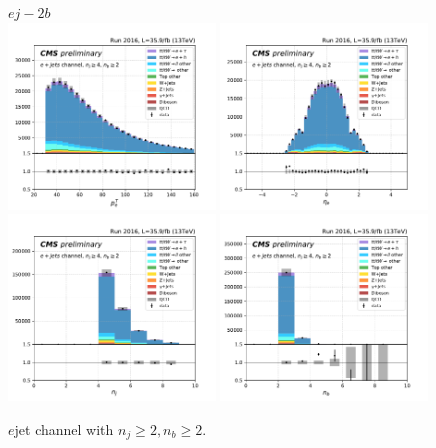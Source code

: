 \begin{figure}[ht]
    \centering
    $e j - 2b$ \\
    \includegraphics[width=0.49\textwidth]{chapters/Analysis/sectionPlots/figures/kinematics_pickles/e4j/2b/e4j_2b_lepton1_pt.pdf}
    \includegraphics[width=0.49\textwidth]{chapters/Analysis/sectionPlots/figures/kinematics_pickles/e4j/2b/e4j_2b_lepton1_eta.pdf}
    \includegraphics[width=0.49\textwidth]{chapters/Analysis/sectionPlots/figures/kinematics_pickles/e4j/2b/e4j_2b_nJets.pdf}
    \includegraphics[width=0.49\textwidth]{chapters/Analysis/sectionPlots/figures/kinematics_pickles/e4j/2b/e4j_2b_nBJets.pdf}
    
    \caption{$e$jet channel with $n_j\geq2, n_b\geq2$.}
\end{figure}
